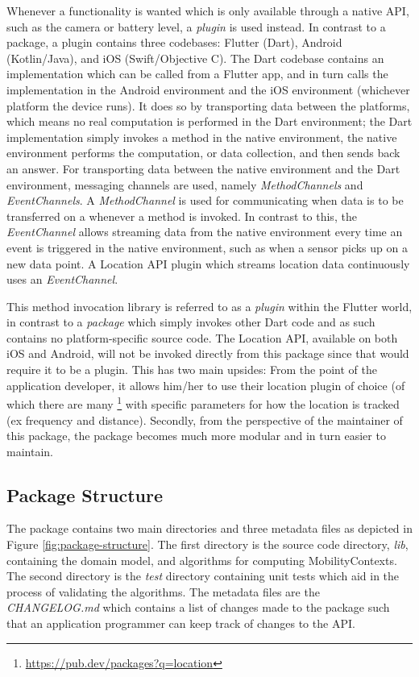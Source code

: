 Whenever a functionality is wanted which is only available through a native API, such as the camera or battery level, a \textit{plugin} is used instead. In contrast to a package, a plugin contains three codebases: Flutter (Dart), Android (Kotlin/Java), and iOS (Swift/Objective C). The Dart codebase contains an implementation which can be called from a Flutter app, and in turn calls the implementation in the Android environment and the iOS environment (whichever platform the device runs). It does so by transporting data between the platforms, which means no real computation is performed in the Dart environment; the Dart implementation simply invokes a method in the native environment, the native environment performs the computation, or data collection, and then sends back an answer. For transporting data between the native environment and the Dart environment, messaging channels are used, namely \textit{MethodChannels} and \textit{EventChannels}. A \textit{MethodChannel} is used for communicating when data is to be transferred on a whenever a method is invoked. In contrast to this, the \textit{EventChannel} allows streaming data from the native environment every time an event is triggered in the native environment, such as when a sensor picks up on a new data point. A Location API plugin which streams location data continuously uses an \textit{EventChannel}.

This method invocation library is referred to as a \textit{plugin} within the Flutter world, in contrast to a \textit{package} which simply invokes other Dart code and as such contains no platform-specific source code.  The Location API, available on both iOS and Android, will not be invoked directly from this package since that would require it to be a plugin. This has two main upsides: From the point of the application developer, it allows him/her to use their location plugin of choice (of which there are many \footnote{\url{https://pub.dev/packages?q=location}} with specific parameters for how the location is tracked (ex frequency and distance). Secondly, from the perspective of the maintainer of this package, the package becomes much more modular and in turn easier to maintain.

\subsection{Package Structure}
The package contains two main directories and three metadata files as depicted in Figure \ref{fig:package-structure}. The first directory is the source code directory, \textit{lib}, containing the domain model, and algorithms for computing MobilityContexts. The second directory is the \textit{test} directory containing unit tests which aid in the process of validating the algorithms. The metadata files are the \textit{CHANGELOG.md} which contains a list of changes made to the package such that an application programmer can keep track of changes to the API. 

